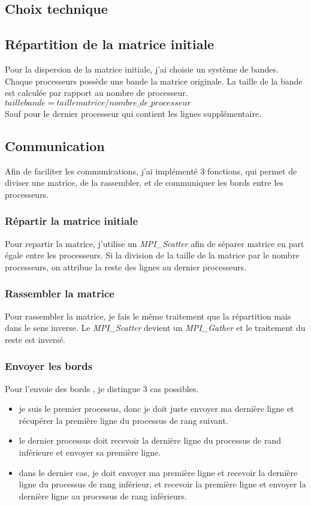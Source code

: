 \documentclass[12pt,a4paper,utf8x]{report}
\begin{document}
\begin{onehalfspace}

\section{Choix technique}
\subsection{Répartition de la matrice initiale}
Pour la dispersion de la matrice initiale, j'ai choisie un système de bandes. Chaque processeurs possède une bande la matrice originale. La taille de la bande est calculée par rapport au nombre de processeur. \\
$ taillebande = taillematrice / nombre\_de\_processeur $ \\
Sauf pour le dernier processeur qui contient les lignes supplémentaire.

\subsection{Communication}
Afin de faciliter les communications, j'ai implémenté 3 fonctions, qui permet de diviser une matrice, de la rassembler, et de communiquer les bords entre les processeurs.

\subsubsection{Répartir la matrice initiale}
	Pour repartir la matrice, j'utilise un \emph{MPI\_Scatter} afin de séparer matrice en part égale entre les processeurs. Si la division de la taille de la matrice par le nombre processeurs, on attribue la reste des lignes au dernier processeurs.

\subsubsection{Rassembler la matrice }
	Pour rassembler la matrice, je fais le même traitement que la répartition mais dans le sens inverse. Le \emph{MPI\_Scatter} devient un \emph{MPI\_Gather} et le traitement du reste est inversé.

\subsubsection{Envoyer les bords}
	Pour l'envoie des bords , je distingue 3 cas possibles.
	\begin{itemize}
	 	\item je suis le premier processus, donc je doit juste envoyer ma dernière ligne et récupérer la première ligne du processus de rang suivant.
	 	\item le dernier processus doit recevoir la dernière ligne du processus de rand inférieure et envoyer sa première ligne.
	 	\item dans le dernier cas, je doit envoyer ma première ligne et recevoir la dernière ligne du processus de rang inférieur, et recevoir la première ligne et envoyer la dernière ligne au processus de rang inférieurs.
	 \end{itemize} 	
	

\end{onehalfspace}
\end{document}
